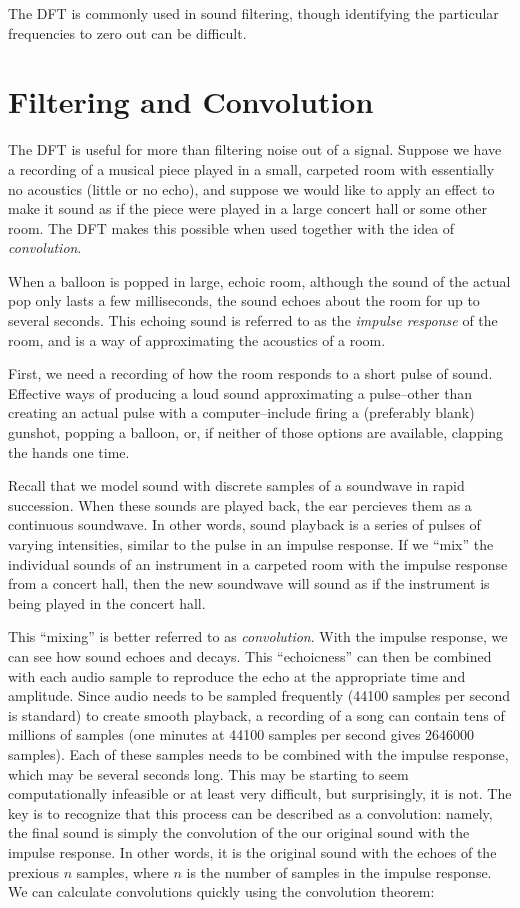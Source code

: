 The DFT is commonly used in sound filtering, though identifying the particular frequencies to zero out can be difficult.

\section*{Filtering and Convolution} %

The DFT is useful for more than filtering noise out of a signal.
Suppose we have a recording of a musical piece played in a small, carpeted room with essentially no acoustics (little or no echo), and suppose we would like to apply an effect to make it sound as if the piece were played in a large concert hall or some other room.
The DFT makes this possible when used together with the idea of \emph{convolution}.

When a balloon is popped in large, echoic room, although the sound of the actual pop only lasts a few milliseconds, the sound echoes about the room for up to several seconds.
This echoing sound is referred to as the \emph{impulse response} of the room, and is a way of approximating the acoustics of a room.

First, we need a recording of how the room responds to a short pulse of sound.
Effective ways of producing a loud sound approximating a pulse--other than creating an actual pulse with a computer--include firing a (preferably blank) gunshot, popping a balloon, or, if neither of those options are available, clapping the hands one time.

Recall that we model sound with discrete samples of a soundwave in rapid succession.
When these sounds are played back, the ear percieves them as a continuous soundwave.
In other words, sound playback is a series of pulses of varying intensities, similar to the pulse in an impulse response.
If we ``mix'' the individual sounds of an instrument in a carpeted room with the impulse response from a concert hall, then the new soundwave will sound as if the instrument is being played in the concert hall.

This ``mixing'' is better referred to as \emph{convolution}. With the impulse response, we can see how sound echoes and decays.  This ``echoicness'' can then be combined with each audio sample to reproduce the echo at the appropriate time and amplitude.
Since audio needs to be sampled frequently (44100 samples per second is standard) to create smooth playback, a recording of a song can contain tens of millions of samples (one minutes at 44100 samples per second gives $2646000$ samples).
Each of these samples needs to be combined with the impulse response, which may be several seconds long.
This may be starting to seem computationally infeasible or at least very difficult, but surprisingly, it is not.
The key is to recognize that this process can be described as a convolution: namely, the final sound is simply the convolution of the our original sound with the impulse response.
In other words, it is the original sound with the echoes of the prexious $n$ samples, where $n$ is the number of samples in the impulse response.
We can calculate convolutions quickly using the convolution theorem:


